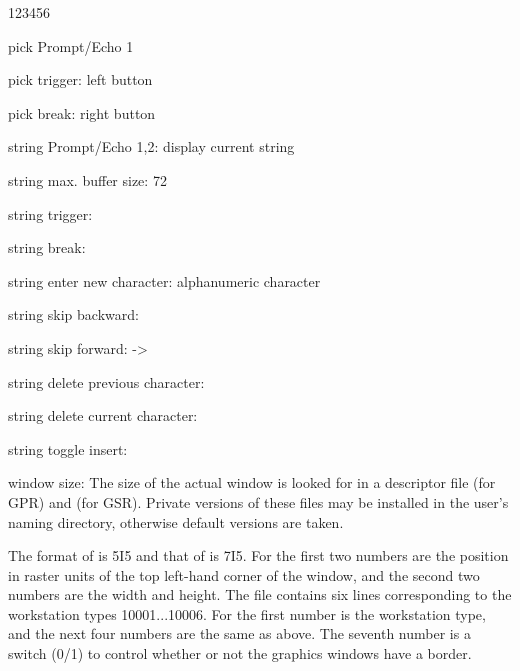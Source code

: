 \begin{DLtt}{123456}
\item[pick Prompt/Echo 1]
\item[pick trigger:]left button
\item[pick break:]right button
\item[string Prompt/Echo 1,2:]display current string
\item[string max. buffer size:]72
\item[string trigger:]
\item[string break:]
\item[string enter new character:]alphanumeric character
\item[string skip backward:]\Lit{<-}
\item[string skip forward:]->
\item[string delete previous character:]
\item[string delete current character:]
\item[string toggle insert:]
\item[window size:]The size of the actual window is looked for in a descriptor
file  (for GPR) and  (for GSR).
Private versions of these files may be installed in the user's naming
directory, otherwise default versions are taken.
 
The format of  is 5I5 and that of
 is 7I5.
For  the first two numbers are the position
in raster units of the top left-hand corner of the window,
and the second two numbers are the width and height.
The file contains six lines corresponding to the workstation
types 10001...10006.
For  the first number is the workstation
type, and the next four numbers are the same as above.
The seventh number is a switch (0/1) to control whether or not
the graphics windows have a border.
\end{DLtt}
